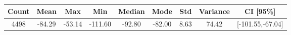 \begin{tabular}{|c|c|c|c|c|c|c|c|c|}\hline
\rowcolor{Plum!20}
Count&Mean&Max&Min&Median&Mode&Std&Variance&CI [95\%]\\\hline\hline
4498&-84.29&-53.14&-111.60&-92.80&-82.00&8.63&74.42&[-101.55,-67.04]\\\hline
\end{tabular}
